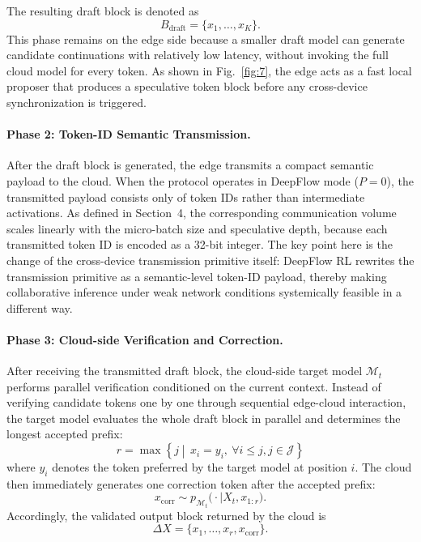\documentclass[a4paper,fleqn]{cas-dc}
\begin{document}
The resulting draft block is denoted as
\begin{equation}
B_{\mathrm{draft}} = \{x_1, \ldots, x_K\}.
\end{equation}
This phase remains on the edge side because a smaller draft model can generate candidate continuations with relatively low latency, without invoking the full cloud model for every token. As shown in Fig.~\ref{fig:7}, the edge acts as a fast local proposer that produces a speculative token block before any cross-device synchronization is triggered.

\paragraph{Phase 2: Token-ID Semantic Transmission.}
After the draft block is generated, the edge transmits a compact semantic payload to the cloud. When the protocol operates in DeepFlow mode ($P=0$), the transmitted payload consists only of token IDs rather than intermediate activations. As defined in Section~4, the corresponding communication volume scales linearly with the micro-batch size and speculative depth, because each transmitted token ID is encoded as a 32-bit integer. The key point here is the change of the cross-device transmission primitive itself: DeepFlow RL rewrites the transmission primitive as a semantic-level token-ID payload, thereby making collaborative inference under weak network conditions systemically feasible in a different way.

\paragraph{Phase 3: Cloud-side Verification and Correction.}
After receiving the transmitted draft block, the cloud-side target model $\mathcal{M}_t$ performs parallel verification conditioned on the current context. Instead of verifying candidate tokens one by one through sequential edge-cloud interaction, the target model evaluates the whole draft block in parallel and determines the longest accepted prefix:
\begin{equation}
r = \max \left\{ j\middle|\, x_i = y_i,\ \forall i \le j ,j \in\mathcal{J} \right\}
\end{equation}
where $y_i$ denotes the token preferred by the target model at position $i$. The cloud then immediately generates one correction token after the accepted prefix:
\begin{equation}
x_{\mathrm{corr}} \sim p_{\mathcal{M}_t}\bigl(\cdot \mid X_t, x_{1:r}\bigr).
\end{equation}
Accordingly, the validated output block returned by the cloud is
\begin{equation}
\Delta X = \{x_1, \ldots, x_r, x_{\mathrm{corr}}\}.
\end{equation}
\end{document}
